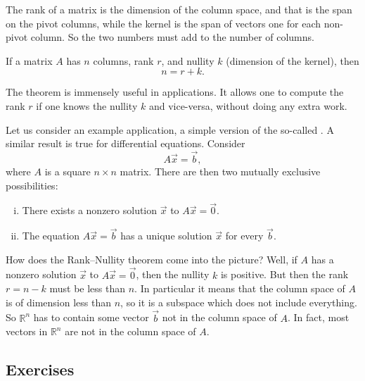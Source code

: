 The rank of a matrix is the dimension of the column space, and that is
the span on the pivot columns, while the kernel is the span of vectors
one for each non-pivot column.  So the two numbers must add to the number of
columns.

\begin{theorem}
If a matrix $A$ has $n$ columns, rank $r$, and nullity $k$ (dimension of the
kernel), then
\begin{equation*}
n = r+k .
\end{equation*}
\end{theorem}

The theorem is immensely useful in applications.  It allows one to compute
the rank $r$ if one knows the nullity $k$ and vice-versa, without doing any
extra work.

Let us consider an example application, a simple version of the so-called
\emph{}.  A similar result is true for
differential equations.  Consider
\begin{equation*}
A \vec{x} = \vec{b} ,
\end{equation*}
where $A$ is a square $n \times n$ matrix.
There are then two mutually exclusive possibilities:
\begin{enumerate}[(i)]
\item
There exists a nonzero solution $\vec{x}$ to $A \vec{x} = \vec{0}$.
\item
The equation $A \vec{x} = \vec{b}$ has a unique solution $\vec{x}$ for every
$\vec{b}$.
\end{enumerate}
How does the Rank--Nullity theorem come into the picture?  Well, if $A$ has
a nonzero solution $\vec{x}$ to $A \vec{x} = \vec{0}$, then the nullity $k$ is
positive.  But then the rank $r = n-k$ must be less than $n$.  In particular
it means that the column space of $A$ is of dimension less than $n$, so it is
a subspace which does not include everything.  So ${\mathbb{R}}^n$ has to
contain some vector $\vec{b}$ not in the column space of $A$.  In fact, most
vectors in ${\mathbb{R}}^n$ are not in the column space of $A$.



\subsection{Exercises}

